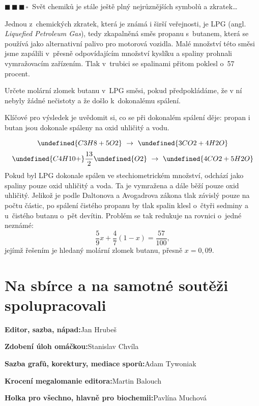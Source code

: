 \documentclass{book}
\let\ch\undefined
\newcommand{\tri}{$\blacksquare \, \blacksquare \, \blacksquare \, \square \; \; $}
\renewenvironment{quotation}{\par}{\par} %
\begin{document}
\newpage %
\begin{quotation}
\tri Svět chemiků je stále ještě plný nejrůznějších symbolů a zkratek…

Jednou z~chemických
zkratek, která je známá i širší veřejnosti, je LPG (angl. \textit{Liquefied
Petroleum Gas}), tedy zkapalněná směs propanu s~butanem, která se
používá jako alternativní palivo pro motorová vozidla. Malé množství
této směsi jsme zapálili v~přesně odpovídajícím množství kyslíku
a spaliny prohnali vymražovacím zařízením. Tlak v~trubici se spalinami
přitom poklesl o~57 procent.

Určete molární zlomek butanu v~LPG směsi, pokud předpokládáme, že
v ní nebyly žádné nečistoty a že došlo k~dokonalému spálení.
\end{quotation} \dotfill \par 

Klíčové pro výsledek je uvědomit si, co se při dokonalém spálení děje: propan i butan jsou dokonale spáleny na oxid uhličitý a vodu.

\[
\ch{C3H8 + 5 O2}\ \rightarrow\ \ch{3 CO2 + 4 H2O}
\]
\[
\ch{C4H10 +} \frac{13}{2}\ch{O2}\ \rightarrow\ \ch{4 CO2 + 5 H2O}
\]
Pokud byl LPG dokonale spálen ve stechiometrickém množství, odchází
jako spaliny pouze oxid uhličitý a voda. Ta je vymražena a dále běží
pouze oxid uhličitý. Jelikož je podle Daltonova a Avogadrova zákona
tlak závislý pouze na počtu částic, po spálení čistého propanu by
tlak spalin klesl o~čtyři sedminy a u~čistého butanu o~pět devítin. Problém
se tak redukuje na rovnici o~jedné neznámé:
\[
\frac{5}{9}x+\frac{4}{7}(1-x)=\frac{57}{100},
\]
jejímž řešením je hledaný molární zlomek butanu, přesně $x=0,09$.
\vfill\pagebreak
\chapter*{Na sbírce a na samotné soutěži spolupracovali}
\textbf{Editor, sazba, nápad:}\tabto{9cm}\-Jan Hrubeš

\textbf{Zdobení úloh omáčkou:}\tabto{9cm}\-Stanislav Chvíla

\textbf{Sazba grafů, korektury, mediace sporů:}\tabto{9cm}\-Adam Tywoniak

\textbf{Krocení megalomanie editora:}\tabto{9cm}\-Martin Balouch

\textbf{Holka pro všechno, hlavně pro biochemii:}\tabto{9cm}\-Pavlína Muchová
\end{document}
